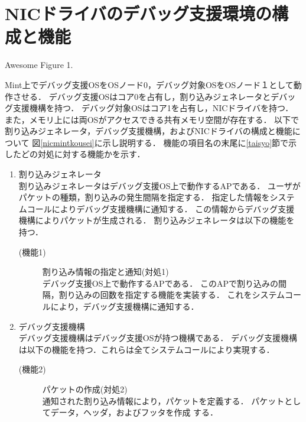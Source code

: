 \documentclass[tanilab-enum]{graduate}
\begin{document}
\section{NICドライバのデバッグ支援環境の構成と機能}
{Awesome Figure 1.}

Mint上でデバッグ支援OSをOSノード0，デバッグ対象OSをOSノード１として動作させる．
デバッグ支援OSはコア0を占有し，割り込みジェネレータとデバッグ支援機構を持つ．
デバッグ対象OSはコア1を占有し，NICドライバを持つ．
また，メモリ上には両OSがアクセスできる共有メモリ空間が存在する．
以下で割り込みジェネレータ，デバッグ支援機構，およびNICドライバの構成と機能について
図\ref{nicmintkousei}に示し説明する．
機能の項目名の末尾に\ref{taisyo}節で示したどの対処に対する機能かを示す．
\begin{enumerate}
    \item 割り込みジェネレータ\\
        割り込みジェネレータはデバッグ支援OS上で動作するAPである．
        ユーザがパケットの種類，割り込みの発生間隔を指定する．
        指定した情報をシステムコールによりデバッグ支援機構に通知する．
        この情報からデバッグ支援機構によりパケットが生成される．
        割り込みジェネレータは以下の機能を持つ．
        \begin{description}
            \item[(機能1)]割り込み情報の指定と通知(対処1)\\
                デバッグ支援OS上で動作するAPである．
                このAPで割り込みの間隔，割り込みの回数を指定する機能を実装する．
                これをシステムコールにより，デバッグ支援機構に通知する．
        \end{description}
    \item デバッグ支援機構\\
        デバッグ支援機構はデバッグ支援OSが持つ機構である．
        デバッグ支援機構は以下の機能を持つ．これらは全てシステムコールにより実現する．
        \begin{description}
            \item[(機能2)]パケットの作成(対処2)\\
                通知された割り込み情報により，パケットを定義する．
                パケットとしてデータ，ヘッダ，およびフッタを作成
                する．


\end{description}
\end{enumerate}
\end{document}
